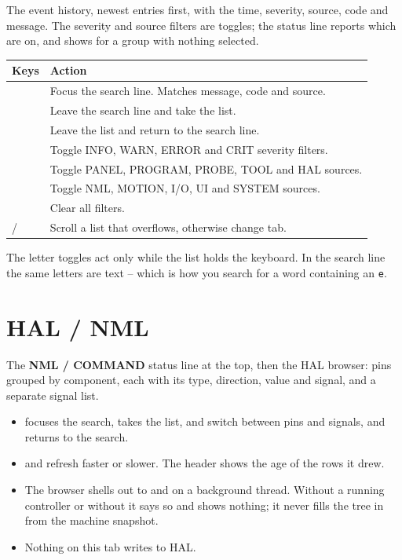 The event history, newest entries first, with the time, severity, source, code and message.
The severity and source filters are toggles; the status line reports which are on, and shows
 for a group with nothing selected.

\begin{longtable}{L{4.7cm}L{8.1cm}}
  \toprule
  \textbf{Keys} & \textbf{Action} \\
  \midrule
  \endhead
  \keycap{/} & Focus the search line. Matches message, code and source. \\
   & Leave the search line and take the list. \\
   & Leave the list and return to the search line. \\
      & Toggle INFO, WARN, ERROR and CRIT severity
        filters. \\
       & Toggle PANEL, PROGRAM, PROBE, TOOL
        and HAL sources. \\
       & Toggle NML, MOTION, I/O, UI and
        SYSTEM sources. \\
   & Clear all filters. \\
   /  & Scroll a list that overflows, otherwise change tab. \\
  \bottomrule
\end{longtable}

\begin{notebox}
  The letter toggles act only while the list holds the keyboard. In the search line the same
  letters are text -- which is how you search for a word containing an \texttt{e}.
\end{notebox}

\section{HAL / NML}

The \textbf{NML / COMMAND} status line at the top, then the HAL browser: pins grouped by
component, each with its type, direction, value and signal, and a separate signal list.

\begin{itemize}
  \item \keycap{/} focuses the search,  takes the list,  and
         switch between pins and signals, and  returns to the search.
  \item {} and  refresh faster or slower. The header shows the age of the
        rows it drew.
  \item The browser shells out to  and  on a
        background thread. Without a running controller or without  it says so
        and shows nothing; it never fills the tree in from the machine snapshot.
  \item Nothing on this tab writes to HAL.
\end{itemize}

